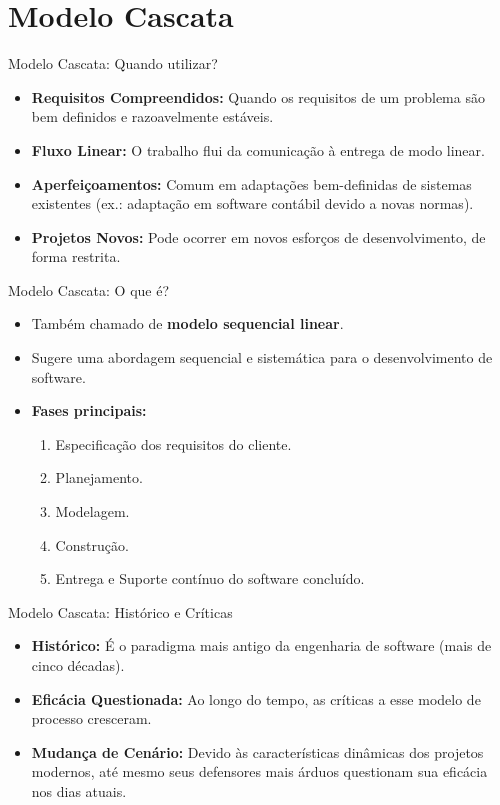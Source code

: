 \documentclass[9pt]{beamer}
\begin{document}
\section{Modelo Cascata}

\begin{frame}{Modelo Cascata: Quando utilizar?}
  \begin{itemize}
    \item \textbf{Requisitos Compreendidos:} Quando os requisitos de um problema são bem definidos e razoavelmente estáveis.
    \item \textbf{Fluxo Linear:} O trabalho flui da comunicação à entrega de modo linear.
    \item \textbf{Aperfeiçoamentos:} Comum em adaptações bem-definidas de sistemas existentes (ex.: adaptação em software contábil devido a novas normas).
    \item \textbf{Projetos Novos:} Pode ocorrer em novos esforços de desenvolvimento, de forma restrita.
  \end{itemize}
\end{frame}

\begin{frame}{Modelo Cascata: O que é?}
  \begin{itemize}
    \item Também chamado de \textbf{modelo sequencial linear}.
    \item Sugere uma abordagem sequencial e sistemática para o desenvolvimento de software.
    \item \textbf{Fases principais:}
      \begin{enumerate}
        \item Especificação dos requisitos do cliente.
        \item Planejamento.
        \item Modelagem.
        \item Construção.
        \item Entrega e Suporte contínuo do software concluído.
      \end{enumerate}
  \end{itemize}
\end{frame}

\begin{frame}{Modelo Cascata: Histórico e Críticas}
  \begin{itemize}
    \item \textbf{Histórico:} É o paradigma mais antigo da engenharia de software (mais de cinco décadas).
    \item \textbf{Eficácia Questionada:} Ao longo do tempo, as críticas a esse modelo de processo cresceram.
    \item \textbf{Mudança de Cenário:} Devido às características dinâmicas dos projetos modernos, até mesmo seus defensores mais árduos questionam sua eficácia nos dias atuais.
  \end{itemize}
\end{frame}
\end{document}
